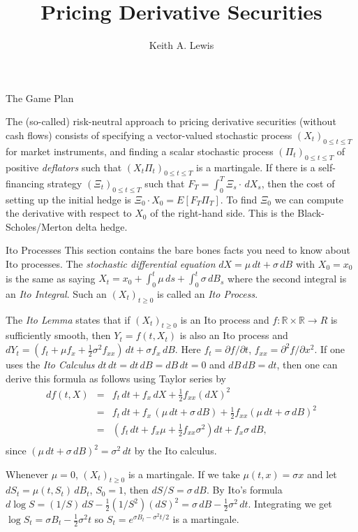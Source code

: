 \documentclass[fleqn]{amsart}
\title{Pricing Derivative Securities}
\author{Keith A. Lewis}
\newcommand{\R}{\mathbb{R}}
\newcommand{\onehalf}{\frac{1}{2}}
\begin{document}
\maketitle

\begin{section}{The Game Plan}

The (so-called) risk-neutral approach to pricing derivative securities
(without cash flows) consists of specifying a vector-valued stochastic
process $(X_t)_{0\le t\le T}$ for market instruments,
and finding a scalar stochastic
process $(\Pi_t)_{0\le t\le T}$ of positive {\em deflators} such that
$(X_t\Pi_t)_{0\le t\le T}$ is a martingale. If there is a self-financing
strategy $(\Xi_t)_{0\le t\le T}$ such that $F_T = \int_0^T \Xi_s\cdot
\,dX_s$, then the cost of setting up the initial hedge is $\Xi_0\cdot
X_0 = E[F_T\Pi_T]$. To find $\Xi_0$ we can compute
the derivative with respect to $X_0$ of the right-hand side.
This is the Black-Scholes/Merton delta hedge.

\end{section}

\begin{section}{Ito Processes}
This section contains the bare bones facts you need to know about
Ito processes. The {\em stochastic differential equation}
$dX = \mu\,dt + \sigma\,dB$ with $X_0 = x_0$ is the same
as saying $X_t = x_0 + \int_0^t \mu\,ds + \int_0^t \sigma\,dB_s$
where the second integral is an {\em Ito Integral}. Such an
$(X_t)_{t\ge0}$ is called an {\em Ito Process}.

The {\em Ito Lemma} states that if $(X_t)_{t\ge0}$ is an Ito process and
$f\colon\R\times\R\to R$ is sufficiently smooth, then $Y_t = f(t, X_t)$
is also an Ito process and $dY_t = (f_t + \mu f_x + \onehalf\sigma^2
f_{xx})\,dt + \sigma f_x\,dB$.	Here $f_t = \partial f/\partial t$,
$f_{xx} = \partial^2 f/\partial x^2$.  If one uses the {\em Ito Calculus}
$dt\,dt = dt\,dB = dB\,dt = 0$ and $dB\,dB = dt$, then one can derive
this formula as follows using Taylor series by \begin{eqnarray*} df(t,
X) &=& f_t\,dt + f_x\,dX + \onehalf f_{xx} (dX)^2\\ &=& f_t\,dt +
f_x\,(\mu\,dt + \sigma\,dB)
	+ \onehalf f_{xx} (\mu\,dt + \sigma\,dB)^2\\
&=& (f_t\,dt + f_x \mu + \onehalf f_{xx} \sigma^2)dt + f_x\sigma\,
dB,\\
\end{eqnarray*}
since $(\mu\,dt + \sigma\,dB)^2 = \sigma^2\,dt$
by the Ito calculus.

Whenever $\mu = 0$, $(X_t)_{t\ge0}$ is a martingale. If we take $\mu(t,x)
= \sigma x$ and let $dS_t = \mu(t,S_t)\,dB_t$, $S_0 = 1$, then $dS/S =
\sigma\,dB$. By Ito's formula $d\log S = (1/S)\,dS - \onehalf (1/S^2)
(dS)^2 = \sigma\,dB - \onehalf\sigma^2\,dt$. Integrating we get $\log S_t
= \sigma B_t - \onehalf\sigma^2 t$ so $S_t = e^{\sigma B_t - \sigma^2t/2}$
is a martingale.

\end{section}
\end{document}

